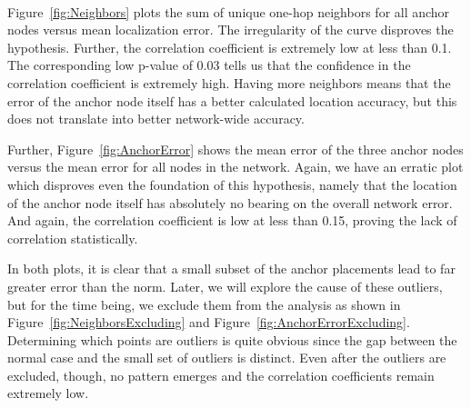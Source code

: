\begin{figure}
  \centering
	\\
	\caption{}	
	\label{}
\end{figure}

Figure~\ref{fig:Neighbors} plots the sum of unique one-hop neighbors for all anchor nodes versus mean localization error.  The irregularity of the curve disproves the hypothesis. Further, the correlation coefficient is extremely low at less than 0.1. The corresponding low p-value of 0.03 tells us that the confidence in the correlation coefficient is extremely high. Having more neighbors means that the error of the anchor node itself has a better calculated location accuracy, but this does not translate into better network-wide accuracy.

Further, Figure~\ref{fig:AnchorError} shows the mean error of the three anchor nodes versus the mean error for all nodes in the network. Again, we have an erratic plot which disproves even the foundation of this hypothesis, namely that the location of the anchor node itself has absolutely no bearing on the overall network error. And again, the correlation coefficient is low at less than 0.15, proving the lack of correlation statistically.

In both plots, it is clear that a small subset of the anchor placements lead to far greater error than the norm.  Later, we will explore the cause of these outliers, but for the time being, we exclude them from the analysis as shown in Figure~\ref{fig:NeighborsExcluding} and Figure~\ref{fig:AnchorErrorExcluding}. Determining which points are outliers is quite obvious since the gap between the normal case and the small set of outliers is distinct. Even after the outliers are excluded, though, no pattern emerges and the correlation coefficients remain extremely low.

